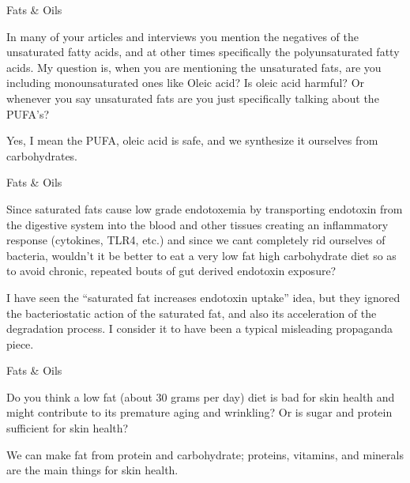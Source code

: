 \documentclass[11pt,oneside,openany,extrafontsizes]{memoir}
\begin{document}
\begin{qaexchange}{Fats \& Oils}

    \begin{question}
         In many of your articles and interviews you mention the negatives of the unsaturated fatty acids, and at other times specifically the polyunsaturated fatty acids. My question is, when you are mentioning the unsaturated fats, are you including monounsaturated ones like Oleic acid? Is oleic acid harmful? Or whenever you say unsaturated fats are you just specifically talking about the PUFA's?
    \end{question}

    \begin{answer}
      Yes, I mean the PUFA, oleic acid is safe, and we synthesize it ourselves from carbohydrates.
    \end{answer}
\end{qaexchange}

\begin{qaexchange}{Fats \& Oils}

    \begin{question}
        Since saturated fats cause low grade endotoxemia by transporting endotoxin from the digestive system into the blood and other tissues creating an inflammatory response (cytokines, TLR4, etc.) and since we cant completely rid ourselves of bacteria, wouldn't it be better to eat a very low fat high carbohydrate diet so as to avoid chronic, repeated bouts of gut derived endotoxin exposure?
    \end{question}

    \begin{answer}
       I have seen the \enquote{saturated fat increases endotoxin uptake} idea, but they ignored the bacteriostatic action of the saturated fat, and also its acceleration of the degradation process. I consider it to have been a typical misleading propaganda piece.
    \end{answer}
\end{qaexchange}

\begin{qaexchange}{Fats \& Oils}

    \begin{question}
        Do you think a low fat (about 30 grams per day) diet is bad for skin health and might contribute to its premature aging and wrinkling? Or is sugar and protein sufficient for skin health?
    \end{question}

    \begin{answer}
      We can make fat from protein and carbohydrate; proteins, vitamins, and minerals are the main things for skin health.
    \end{answer}
\end{qaexchange}
\end{document}
